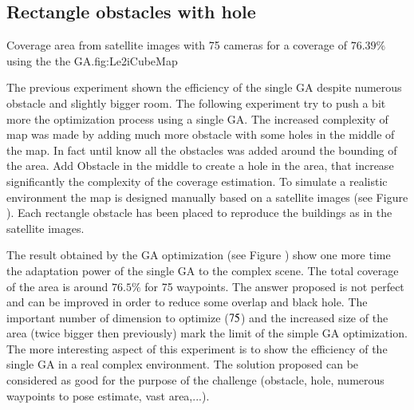 	\subsection{Rectangle obstacles with hole}\label{sec:RecObstacleHole}

\begin{mfigures}[!]
{Coverage area from satellite images with 75 cameras for a coverage of $76.39\%$ using the the GA.}{fig:Le2iCubeMap} \centering
{}
\hspace{1cm}
\hspace{1cm}
\tabsimuposeIUTcube
\end{mfigures}	

The previous experiment shown the efficiency of the single GA despite numerous obstacle and slightly bigger room. The following experiment try to push a bit more the optimization process using a single GA. The increased complexity of map was made by adding much more obstacle with some holes in the middle of the map. In fact until know all the obstacles was added around the bounding of the area. Add Obstacle in the middle to create a hole in the area, that increase significantly the complexity of the coverage estimation.
To simulate a realistic environment the map is designed manually based on a satellite images (see Figure ). Each rectangle obstacle has been placed to reproduce the buildings as in  the satellite images. 

The result obtained by the GA optimization (see Figure ) show one more time the adaptation power of the single GA to the complex scene. The total coverage of the area is around $76.5\%$ for 75 waypoints. The answer proposed is not perfect and can be improved in order to reduce some overlap and black hole. The important number of dimension to optimize ($75\time 4$) and the increased size of the area (twice bigger then previously) mark the limit of the simple GA optimization.\\
	The more interesting aspect of this experiment is to show the efficiency of the single GA in a real complex environment. The solution proposed can be considered as good for the purpose of the challenge (obstacle, hole, numerous waypoints to pose estimate, vast area,...). 
  
